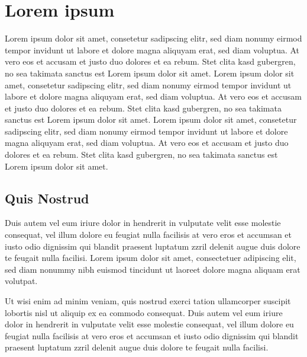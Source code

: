 \documentclass[]{../thesis}
\begin{document}
	\newtoc
	
	\newlof
	
	\newlot
	
	\begin{acron}
	\end{acron}
	
    \startthesiscontent	
	
	\chapter{Lorem ipsum} 
	Lorem ipsum dolor sit amet, consetetur sadipscing elitr, sed diam nonumy eirmod tempor invidunt ut labore et dolore magna aliquyam erat, sed diam voluptua. At vero eos et accusam et justo duo dolores et ea rebum. Stet clita kasd gubergren, no sea takimata sanctus est Lorem ipsum dolor sit amet. Lorem ipsum dolor sit amet, consetetur sadipscing elitr, sed diam nonumy eirmod tempor invidunt ut labore et dolore magna aliquyam erat, sed diam voluptua. At vero eos et accusam et justo duo dolores et ea rebum. Stet clita kasd gubergren, no sea takimata sanctus est Lorem ipsum dolor sit amet. Lorem ipsum dolor sit amet, consetetur sadipscing elitr, sed diam nonumy eirmod tempor invidunt ut labore et dolore magna aliquyam erat, sed diam voluptua. At vero eos et accusam et justo duo dolores et ea rebum. Stet clita kasd gubergren, no sea takimata sanctus est Lorem ipsum dolor sit amet.   
    
    \section{Quis Nostrud}
    
    Duis autem vel eum iriure dolor in hendrerit in vulputate velit esse molestie consequat, vel illum dolore eu feugiat nulla facilisis at vero eros et accumsan et iusto odio dignissim qui blandit praesent luptatum zzril delenit augue duis dolore te feugait nulla facilisi. Lorem ipsum dolor sit amet, consectetuer adipiscing elit, sed diam nonummy nibh euismod tincidunt ut laoreet dolore magna aliquam erat volutpat.   
    
    Ut wisi enim ad minim veniam, quis nostrud exerci tation ullamcorper suscipit lobortis nisl ut aliquip ex ea commodo consequat. Duis autem vel eum iriure dolor in hendrerit in vulputate velit esse molestie consequat, vel illum dolore eu feugiat nulla facilisis at vero eros et accumsan et iusto odio dignissim qui blandit praesent luptatum zzril delenit augue duis dolore te feugait nulla facilisi.   
    
\end{document}
